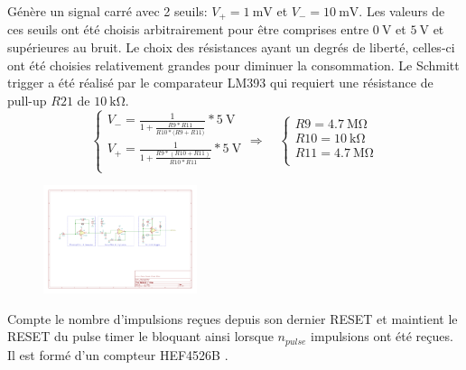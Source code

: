 \documentclass[french]{layout/Report}
\begin{document}
\begin{description}[leftmargin=!,labelwidth=3cm, labelindent=\parindent]
	\item[Schmitt trigger]
        Génère un signal carré avec 2 seuils: $V_+ = \SI{1}{\milli\volt}$ et $V_- = \SI{10}{\milli\volt}$.
        Les valeurs de ces seuils ont été choisis arbitrairement pour être comprises entre $\SI{0}{\volt}$ et $\SI{5}{\volt}$ et supérieures au bruit.
        Le choix des résistances ayant un degrés de liberté, celles-ci ont été choisies relativement grandes pour diminuer la consommation.
        Le Schmitt trigger a été réalisé par le comparateur LM393 \cite{LM393} qui requiert une résistance de pull-up $\mathit{R21}$ de $\SI{10}{\kilo\ohm}$.
        	\begin{equation*}
    		\begin{cases}
    			V_- = \frac{1}{1+\frac{\mathit{R9}*\mathit{R11}}{\mathit{R10}*(\mathit{R9+\mathit{R11})}}}*\SI{5}{\volt} \\
    			V_+ = \frac{1}{1+\frac{\mathit{R9}*(\mathit{R10}+\mathit{R11})}{\mathit{R10}*\mathit{R11}}}*\SI{5}{\volt} \\
    		\end{cases}
    		\Rightarrow\quad
    		\begin{cases}
    			\mathit{R9}  = \SI{4.7}{\mega\ohm} \\
    			\mathit{R10} = \SI{10}{\kilo\ohm} \\
    			\mathit{R11} = \SI{4.7}{\mega\ohm} \\
    		\end{cases}
    		\end{equation*}

            \begin{figure}[H]
                \centering
                \includegraphics[width=0.4\textwidth]{fig/schmitt_trigger.pdf}
            \end{figure}

	\item[Down counter] Compte le nombre d'impulsions reçues depuis son dernier RESET et maintient le RESET du pulse timer le bloquant ainsi lorsque $n_{pulse}$ impulsions ont été reçues. Il est formé d'un compteur HEF4526B \cite{HEF4526B}.


\end{description}
\end{document}
